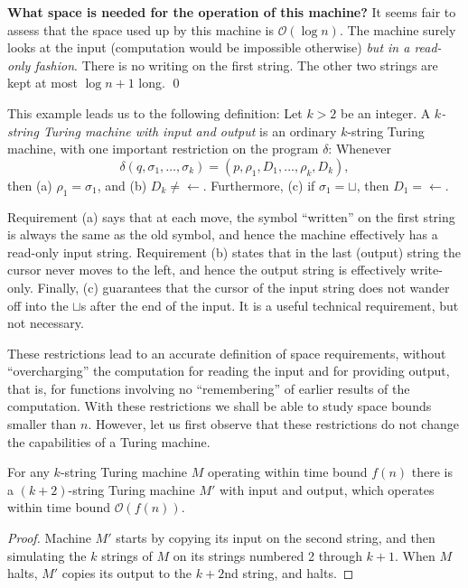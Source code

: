 \documentclass[12pt]{article}
\begin{document}
\textbf{What space is needed for the operation of this machine?} It seems fair to assess that the space used up by this machine is $\mathcal{O}(\log n)$. The machine surely looks at the input (computation would be impossible otherwise) \textit{but in a read-only fashion}. There is no writing on the first string. The other two strings are kept at most $\log n + 1$ long. \qed

This example leads us to the following definition: Let $k > 2$ be an integer. A \textit{$k$-string Turing machine with input and output} is an ordinary $k$-string Turing machine, with one important restriction on the program $\delta$: Whenever 
\[
\delta(q, \sigma_1, \ldots, \sigma_k) = (p, \rho_1, D_1, \ldots, \rho_k, D_k),
\]
then (a) $\rho_1 = \sigma_1$, and (b) $D_k \neq \leftarrow$. Furthermore, (c) if $\sigma_1 = \sqcup$, then $D_1 = \leftarrow$. 

Requirement (a) says that at each move, the symbol ``written'' on the first string is always the same as the old symbol, and hence the machine effectively has a read-only input string. Requirement (b) states that in the last (output) string the cursor never moves to the left, and hence the output string is effectively write-only. Finally, (c) guarantees that the cursor of the input string does not wander off into the $\sqcup$s after the end of the input. It is a useful technical requirement, but not necessary.

These restrictions lead to an accurate definition of space requirements, without ``overcharging'' the computation for reading the input and for providing output, that is, for functions involving no ``remembering'' of earlier results of the computation. With these restrictions we shall be able to study space bounds smaller than $n$. However, let us first observe that these restrictions do not change the capabilities of a Turing machine.

\begin{defbox}[Proposition]
  For any $k$-string Turing machine $M$ operating within time bound $f(n)$ there is a $(k+2)$-string Turing machine $M'$ with input and output, which operates within time bound $\mathcal{O}(f(n))$.
\end{defbox}
\begin{proof}
  Machine $M'$ starts by copying its input on the second string, and then simulating the $k$ strings of $M$ on its strings numbered 2 through $k+1$. When $M$ halts, $M'$ copies its output to the $k+2$nd string, and halts.
\end{proof} 
\end{document}
